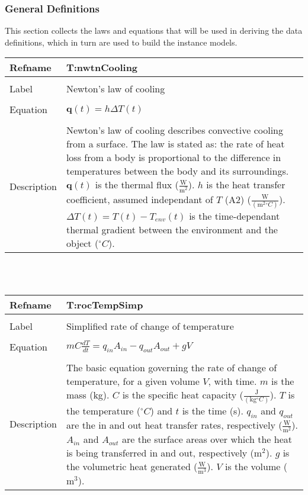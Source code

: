 \documentclass[12pt]{article}
\begin{document}
\subsubsection{General Definitions}
\label{Sec:GeneDefi}
This section collects the laws and equations that will be used in deriving the data definitions, which in turn are used to build the instance models.
~\newline
\noindent \begin{minipage}{\textwidth}
\begin{tabular}{p{} p{}}
\toprule \textbf{Refname} & \textbf{T:nwtnCooling}
\label{T:nwtnCooling}
\\ \midrule \\
Label & Newton's law of cooling
\\ \midrule \\
Equation & $\mathbf{q}\left(t\right)=h\Delta{}T\left(t\right)$
\\ \midrule \\
Description & Newton's law of cooling describes convective cooling from a surface. The law is stated as: the rate of heat loss from a body is proportional to the difference in temperatures between the body and its surroundings. $\mathbf{q}\left(t\right)$ is the thermal flux ($\frac{\text{W}}{\text{m}^{2}}$). $h$ is the heat transfer coefficient, assumed independant of $T$ (A2) ($\frac{\text{W}}{(\text{m}^{2}{}^{\circ}C)}$). $\Delta{}T\left(t\right)=T\left(t\right)-T_{env}\left(t\right)$ is the time-dependant thermal gradient between the environment and the object (${}^{\circ}C$).
\\ \bottomrule \end{tabular}
\end{minipage}\\
~\newline
\noindent \begin{minipage}{\textwidth}
\begin{tabular}{p{} p{}}
\toprule \textbf{Refname} & \textbf{T:rocTempSimp}
\label{T:rocTempSimp}
\\ \midrule \\
Label & Simplified rate of change of temperature
\\ \midrule \\
Equation & $mC\frac{dT}{dt}=q_{in}A_{in}-q_{out}A_{out}+gV$
\\ \midrule \\
Description & The basic equation governing the rate of change of temperature, for a given volume $V$, with time. $m$ is the mass (kg). $C$ is the specific heat capacity ($\frac{\text{J}}{(\text{kg}{}^{\circ}C)}$). $T$ is the temperature (${}^{\circ}C$) and $t$ is the time (s). $q_{in}$ and $q_{out}$ are the in and out heat transfer rates, respectively ($\frac{\text{W}}{\text{m}^{2}}$). $A_{in}$ and $A_{out}$ are the surface areas over which the heat is being transferred in and out, respectively ($\text{m}^{2}$). $g$ is the volumetric heat generated ($\frac{\text{W}}{\text{m}^{3}}$). $V$ is the volume ($\text{m}^{3}$).
\\ \bottomrule \end{tabular}
\end{minipage}\\
\end{document}

